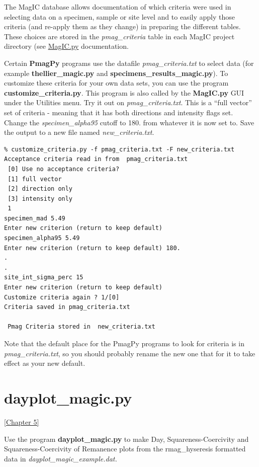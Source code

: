 \documentclass[11pt]{book}
\begin{document}
{{{{{The MagIC database allows documentation of which criteria were used in selecting data on a specimen, sample or site level and to easily apply those criteria (and re-apply them as they change) in preparing the different tables.  These choices are stored in the {\it pmag\_criteria} table in each MagIC project directory (see \href{#MagIC.py}{MagIC.py} documentation.

 Certain {\bf PmagPy} programs use the datafile {\it pmag\_criteria.txt} to select data (for example {\bf thellier\_magic.py} and {\bf specimens\_results\_magic.py}).  To customize these criteria for your own data sets, you can use the program {\bf customize\_criteria.py}.  This program is also called by the {\bf MagIC.py} GUI under the Utilities menu.    Try it out on {\it pmag\_criteria.txt}.   This is a ``full vector'' set of criteria - meaning that it has both directions and intensity flags set.  Change the {\it specimen\_alpha95} cutoff to 180. from whatever it is now set to.   Save the output to a new file named {\it new\_criteria.txt}.

\begin{verbatim}
% customize_criteria.py -f pmag_criteria.txt -F new_criteria.txt
Acceptance criteria read in from  pmag_criteria.txt
 [0] Use no acceptance criteria?
 [1] full vector
 [2] direction only
 [3] intensity only 
 1
specimen_mad 5.49
Enter new criterion (return to keep default) 
specimen_alpha95 5.49
Enter new criterion (return to keep default) 180.
.
.
site_int_sigma_perc 15
Enter new criterion (return to keep default) 
Customize criteria again ? 1/[0]
Criteria saved in pmag_criteria.txt

 Pmag Criteria stored in  new_criteria.txt 

\end{verbatim}

Note that the default place for the PmagPy programs to look for criteria is in {\it pmag\_criteria.txt}, so you should probably rename the new one that for it to take effect as your new default.

%

\section{dayplot\_magic.py}
\href{http://magician.ucsd.edu/Essentials/WebBook2.html#Magnetic_hysteresis}{[Chapter 5]} 

 Use the program {\bf dayplot\_magic.py}  to make Day, Squareness-Coercivity and Squareness-Coercivity of Remanence plots from the rmag\_hyseresis formatted data in {\it dayplot\_magic\_example.dat.}     
 
}}}}}
\end{document}
